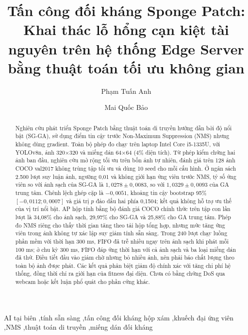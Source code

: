 \documentclass[a4paper,fleqn]{cas-dc}
\begin{document}
\let\WriteBookmarks\relax
\def\floatpagepagefraction{1}
\def\textpagefraction{.001}
\title[mode=title]{Tấn công đối kháng Sponge Patch: Khai thác lỗ hổng cạn kiệt tài nguyên trên hệ thống Edge Server bằng thuật toán tối ưu không gian}
\author[1]{Phạm Tuấn Anh}
\cormark[1]
\author[1]{Mai Quốc Bảo}

\begin{abstract}
Nghiên cứu phát triển Sponge Patch bằng thuật toán di truyền hướng dẫn bởi độ nổi bật (SG-GA), sử dụng điểm tin cậy trước Non-Maximum Suppression (NMS) nhưng không dùng gradient. Toàn bộ phép đo chạy trên laptop Intel Core i5-1335U, với YOLOv8n, ảnh 320×320 và miếng dán 64×64 (4\% diện tích). Từ phép kiểm chứng hai ảnh ban đầu, nghiên cứu mở rộng tối ưu trên bốn ảnh tự nhiên, đánh giá trên 128 ảnh COCO val2017 không trùng tập tối ưu và dùng 10 seed cho mỗi cấu hình. Ở ngân sách 2.500 lượt suy luận ảnh, ngưỡng 0,01 và không giới hạn ứng viên trước NMS, tỷ số ứng viên so với ảnh sạch của SG-GA là $1{,}0278\pm0{,}0083$, so với $1{,}0329\pm0{,}0093$ của GA trung tâm. Chênh lệch ghép cặp là $-0{,}0051$, khoảng tin cậy bootstrap 95\% $[-0{,}0112;0{,}0007]$ và giá trị $p$ đảo dấu hai phía 0,1504; kết quả không hỗ trợ ưu thế của vị trí nổi bật. AP hộp tính bằng bộ đánh giá COCO chính thức trên tập con lần lượt là 34,08\% cho ảnh sạch, 29,97\% cho SG-GA và 25,88\% cho GA trung tâm. Phép đo NMS riêng cho thấy thời gian tăng theo tải hộp tổng hợp, nhưng mức tăng ứng viên trong ảnh không tự xác lập suy giảm tính sẵn sàng. Trong 240 lượt chạy luồng phần mềm với thời hạn 300 ms, FIFO đã trễ nhiều ngay trên ảnh sạch khi phát mỗi 100 ms; ở chu kỳ 300 ms, FIFO đáp ứng thời hạn với cả ảnh sạch và ba loại miếng dán đã thử. Điều tiết đầu vào giảm chờ nhưng bỏ nhiều ảnh, nên phải báo chất lượng theo toàn bộ ảnh được phát. Các kết quả phân biệt giảm độ chính xác với tăng chi phí hệ thống, đồng thời chỉ ra giới hạn của fitness đại diện. Chưa có bằng chứng DoS qua webcam hoặc kết luận phổ quát cho phần cứng khác.
\end{abstract}

\begin{keywords}[Từ khóa]
AI tại biên \sep tính sẵn sàng \sep tấn công đối kháng hộp xám \sep khuếch đại ứng viên \sep NMS \sep thuật toán di truyền \sep miếng dán đối kháng
\end{keywords}
\maketitle
\end{document}
